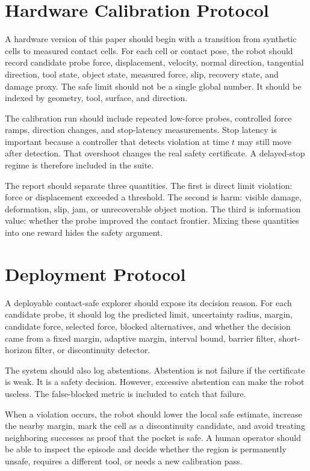 \documentclass{article}
\begin{document}
\section{Hardware Calibration Protocol}

A hardware version of this paper should begin with a transition from synthetic
cells to measured contact cells. For each cell or contact pose, the robot
should record candidate probe force, displacement, velocity, normal direction,
tangential direction, tool state, object state, measured force, slip, recovery
state, and damage proxy. The safe limit should not be a single global number.
It should be indexed by geometry, tool, surface, and direction.

The calibration run should include repeated low-force probes, controlled force
ramps, direction changes, and stop-latency measurements. Stop latency is
important because a controller that detects violation at time $t$ may still
move after detection. That overshoot changes the real safety certificate. A
delayed-stop regime is therefore included in the suite.

The report should separate three quantities. The first is direct limit
violation: force or displacement exceeded a threshold. The second is harm:
visible damage, deformation, slip, jam, or unrecoverable object motion. The
third is information value: whether the probe improved the contact frontier.
Mixing these quantities into one reward hides the safety argument.

\section{Deployment Protocol}

A deployable contact-safe explorer should expose its decision reason. For each
candidate probe, it should log the predicted limit, uncertainty radius, margin,
candidate force, selected force, blocked alternatives, and whether the decision
came from a fixed margin, adaptive margin, interval bound, barrier filter,
short-horizon filter, or discontinuity detector.

The system should also log abstentions. Abstention is not failure if the
certificate is weak. It is a safety decision. However, excessive abstention can
make the robot useless. The false-blocked metric is included to catch that
failure.

When a violation occurs, the robot should lower the local safe estimate,
increase the nearby margin, mark the cell as a discontinuity candidate, and
avoid treating neighboring successes as proof that the pocket is safe. A
human operator should be able to inspect the episode and decide whether the
region is permanently unsafe, requires a different tool, or needs a new
calibration pass.
\end{document}
